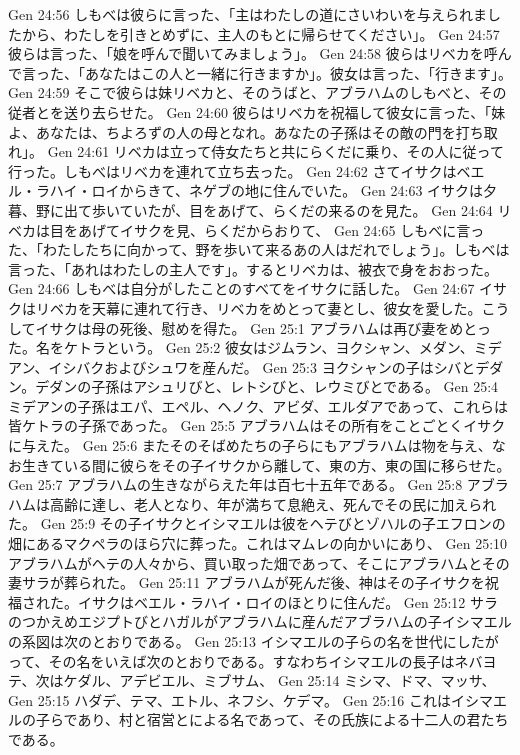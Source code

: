 Gen 24:56  しもべは彼らに言った、「主はわたしの道にさいわいを与えられましたから、わたしを引きとめずに、主人のもとに帰らせてください」。
Gen 24:57  彼らは言った、「娘を呼んで聞いてみましょう」。
Gen 24:58  彼らはリベカを呼んで言った、「あなたはこの人と一緒に行きますか」。彼女は言った、「行きます」。
Gen 24:59  そこで彼らは妹リベカと、そのうばと、アブラハムのしもべと、その従者とを送り去らせた。
Gen 24:60  彼らはリベカを祝福して彼女に言った、「妹よ、あなたは、ちよろずの人の母となれ。あなたの子孫はその敵の門を打ち取れ」。
Gen 24:61  リベカは立って侍女たちと共にらくだに乗り、その人に従って行った。しもべはリベカを連れて立ち去った。
Gen 24:62  さてイサクはベエル・ラハイ・ロイからきて、ネゲブの地に住んでいた。
Gen 24:63  イサクは夕暮、野に出て歩いていたが、目をあげて、らくだの来るのを見た。
Gen 24:64  リベカは目をあげてイサクを見、らくだからおりて、
Gen 24:65  しもべに言った、「わたしたちに向かって、野を歩いて来るあの人はだれでしょう」。しもべは言った、「あれはわたしの主人です」。するとリベカは、被衣で身をおおった。
Gen 24:66  しもべは自分がしたことのすべてをイサクに話した。
Gen 24:67  イサクはリベカを天幕に連れて行き、リベカをめとって妻とし、彼女を愛した。こうしてイサクは母の死後、慰めを得た。
Gen 25:1  アブラハムは再び妻をめとった。名をケトラという。
Gen 25:2  彼女はジムラン、ヨクシャン、メダン、ミデアン、イシバクおよびシュワを産んだ。
Gen 25:3  ヨクシャンの子はシバとデダン。デダンの子孫はアシュリびと、レトシびと、レウミびとである。
Gen 25:4  ミデアンの子孫はエパ、エペル、ヘノク、アビダ、エルダアであって、これらは皆ケトラの子孫であった。
Gen 25:5  アブラハムはその所有をことごとくイサクに与えた。
Gen 25:6  またそのそばめたちの子らにもアブラハムは物を与え、なお生きている間に彼らをその子イサクから離して、東の方、東の国に移らせた。
Gen 25:7  アブラハムの生きながらえた年は百七十五年である。
Gen 25:8  アブラハムは高齢に達し、老人となり、年が満ちて息絶え、死んでその民に加えられた。
Gen 25:9  その子イサクとイシマエルは彼をヘテびとゾハルの子エフロンの畑にあるマクペラのほら穴に葬った。これはマムレの向かいにあり、
Gen 25:10  アブラハムがヘテの人々から、買い取った畑であって、そこにアブラハムとその妻サラが葬られた。
Gen 25:11  アブラハムが死んだ後、神はその子イサクを祝福された。イサクはベエル・ラハイ・ロイのほとりに住んだ。
Gen 25:12  サラのつかえめエジプトびとハガルがアブラハムに産んだアブラハムの子イシマエルの系図は次のとおりである。
Gen 25:13  イシマエルの子らの名を世代にしたがって、その名をいえば次のとおりである。すなわちイシマエルの長子はネバヨテ、次はケダル、アデビエル、ミブサム、
Gen 25:14  ミシマ、ドマ、マッサ、
Gen 25:15  ハダデ、テマ、エトル、ネフシ、ケデマ。
Gen 25:16  これはイシマエルの子らであり、村と宿営とによる名であって、その氏族による十二人の君たちである。
